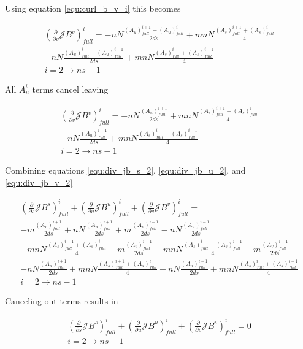\documentclass[11pt]{article}
\newcommand{\brackets}[1]{\left(#1\right)}
\newcommand{\equ}[2]{
	\begin{equation}
    \begin{split}
	#1
	\label{#2}
	\end{split}
	\end{equation}
}
\begin{document}
Using equation \ref{equ:curl_b_v_i} this becomes
\equ{
\brackets{\frac{\partial}{\partial v}\mathcal{J}B^{v}}^{i}_{full}=-nN\frac{\brackets{A_{u}}^{i+1}_{full}-\brackets{A_{u}}^{i}_{full}}{2ds}+mnN\frac{\brackets{A_{s}}^{i+1}_{full}+\brackets{A_{s}}^{i}_{full}}{4}\\
-nN\frac{\brackets{A_{u}}^{i}_{full}-\brackets{A_{u}}^{i-1}_{full}}{2ds}+mnN\frac{\brackets{A_{s}}^{i}_{full}+\brackets{A_{s}}^{i-1}_{full}}{4}\\
i=2\rightarrow ns-1
}{equ:div_jb_v_1}
All $A^{i}_u$ terms cancel leaving
\equ{
\brackets{\frac{\partial}{\partial v}\mathcal{J}B^{v}}^{i}_{full}=-nN\frac{\brackets{A_{u}}^{i+1}_{full}}{2ds}+mnN\frac{\brackets{A_{s}}^{i+1}_{full}+\brackets{A_{s}}^{i}_{full}}{4}\\
+nN\frac{\brackets{A_{u}}^{i-1}_{full}}{2ds}+mnN\frac{\brackets{A_{s}}^{i}_{full}+\brackets{A_{s}}^{i-1}_{full}}{4}\\
i=2\rightarrow ns-1
}{equ:div_jb_v_2}
Combining equations \ref{equ:div_jb_s_2}, \ref{equ:div_jb_u_2}, and \ref{equ:div_jb_v_2}
\equ{
\brackets{\frac{\partial}{\partial s}\mathcal{J}B^{s}}^{i}_{full}+\brackets{\frac{\partial}{\partial u}\mathcal{J}B^{u}}^{i}_{full}+\brackets{\frac{\partial}{\partial v}\mathcal{J}B^{v}}^{i}_{full}=\\
-m\frac{\brackets{A_{v}}^{i+1}_{full}}{2ds}+nN\frac{\brackets{A_{u}}^{i+1}_{full}}{2ds}+m\frac{\brackets{A_{v}}^{i-1}_{full}}{2ds}-nN\frac{\brackets{A_{u}}^{i-1}_{full}}{2ds}\\
-mnN\frac{\brackets{A_{s}}^{i+1}_{full}+\brackets{A_{s}}^{i}_{full}}{4}+m\frac{\brackets{A_{v}}^{i+1}_{full}}{2ds}-mnN\frac{\brackets{A_{s}}^{i}_{full}+\brackets{A_{s}}^{i-1}_{full}}{4}-m\frac{\brackets{A_{v}}^{i-1}_{full}}{2ds}\\
-nN\frac{\brackets{A_{u}}^{i+1}_{full}}{2ds}+mnN\frac{\brackets{A_{s}}^{i+1}_{full}+\brackets{A_{s}}^{i}_{full}}{4}+nN\frac{\brackets{A_{u}}^{i-1}_{full}}{2ds}+mnN\frac{\brackets{A_{s}}^{i}_{full}+\brackets{A_{s}}^{i-1}_{full}}{4}\\
i=2\rightarrow ns-1
}{equ:div_total}
Canceling out terms results in
\equ{
\brackets{\frac{\partial}{\partial s}\mathcal{J}B^{s}}^{i}_{full}+\brackets{\frac{\partial}{\partial u}\mathcal{J}B^{u}}^{i}_{full}+\brackets{\frac{\partial}{\partial v}\mathcal{J}B^{v}}^{i}_{full}=0\\
i=2\rightarrow ns-1
}{equ:div_total_1}
\end{document}
